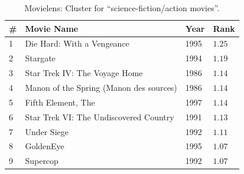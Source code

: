 \documentclass[12pt]{article}
\begin{document}
\begin{table}[h]
\centering
\begin{tabular}{llll}\toprule
\# & Movie Name                         & Year &  Rank       \\ \hline
1 & Die Hard: With a Vengeance & 1995 & $1.25$ \\
2 & Stargate & 1994 & $1.19$ \\
3 & Star Trek IV: The Voyage Home & 1986 & $1.14$ \\
4 & Manon of the Spring (Manon des sources) & 1986 & $1.14$ \\
5 & Fifth Element, The & 1997 & $1.14$ \\
6 & Star Trek VI: The Undiscovered Country & 1991 & $1.13$ \\
7 & Under Siege & 1992 & $1.11$ \\
8 & GoldenEye & 1995 & $1.07$ \\
9 & Supercop & 1992 & $1.07$ \\ \bottomrule
\end{tabular}
\caption{\label{tab:scifi_movies} Movielens: Cluster for ``science-fiction/action movies''.}
\end{table}
\end{document}
